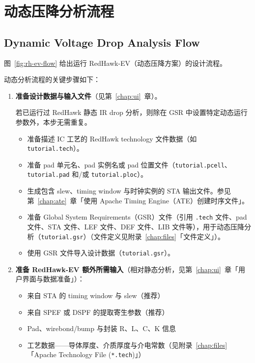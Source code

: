 \section{动态压降分析流程}
\subsection*{Dynamic Voltage Drop Analysis Flow}

图~\ref{fig:rh-ev-flow} 给出运行 RedHawk-EV（动态压降方案）的设计流程。

\label{fig:rh-ev-flow}

动态分析流程的关键步骤如下：

\begin{enumerate}
  \item \textbf{准备设计数据与输入文件}（见第~\ref{chap:ui}~章）。
  \begin{noteBox}
  若已运行过 RedHawk 静态 IR drop 分析，则除在 GSR 中设置特定动态运行参数外，本步无需重复。
  \end{noteBox}
  \begin{itemize}
    \item 准备描述 IC 工艺的 RedHawk technology 文件数据（如 \texttt{tutorial.tech}）。
    \item 准备 pad 单元名、pad 实例名或 pad 位置文件（\texttt{tutorial.pcell}、\texttt{tutorial.pad} 和/或 \texttt{tutorial.ploc}）。
    \item 生成包含 slew、timing window 与时钟实例的 STA 输出文件。参见第~\ref{chap:ate}~章「使用 Apache Timing Engine（ATE）创建时序文件」。
    \item 准备 Global System Requirements（GSR）文件（引用 \texttt{.tech} 文件、pad 文件、STA 文件、LEF 文件、DEF 文件、LIB 文件等），用于动态压降分析（\texttt{tutorial.gsr}）（文件定义见附录~\ref{chap:files}「文件定义」）。
    \item 使用 GSR 文件导入设计数据（\texttt{tutorial.gsr}）。
  \end{itemize}
  \item \textbf{准备 RedHawk-EV 额外所需输入}（相对静态分析，见第~\ref{chap:ui}~章「用户界面与数据准备」）：
  \begin{itemize}
    \item 来自 STA 的 timing window 与 slew（推荐）
    \item 来自 SPEF 或 DSPF 的提取寄生参数（推荐）
    \item Pad、wirebond/bump 与封装 R、L、C、K 信息
    \item 工艺数据——导体厚度、介质厚度与介电常数（见附录~\ref{chap:files}「Apache Technology File (\texttt{*.tech})」）

\end{itemize}
\end{enumerate}
